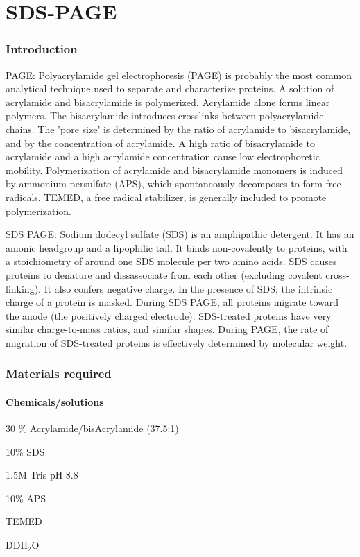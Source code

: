 \part{SDS-PAGE}
\newpage
\setlength{\parindent}{0pt}
\setcounter{secnumdepth}{5}
\setcounter{section}{0}
\renewcommand*{\theHsection}{sds.\the\value{section}}
 
\section{Introduction}
\underline{PAGE:}
Polyacrylamide gel electrophoresis (PAGE) is probably the most common analytical technique used to separate and characterize proteins. A solution of acrylamide and bisacrylamide is polymerized. Acrylamide alone forms linear polymers. The bisacrylamide introduces crosslinks between polyacrylamide chains. The 'pore size' is determined by the ratio of acrylamide to bisacrylamide, and by the concentration of acrylamide. A high ratio of bisacrylamide to acrylamide and a high acrylamide concentration cause low electrophoretic mobility. Polymerization of acrylamide and bisacrylamide monomers is induced by ammonium persulfate (APS), which spontaneously decomposes to form free radicals. TEMED, a free radical stabilizer, is generally included to promote polymerization.

\underline{SDS PAGE:}
Sodium dodecyl sulfate (SDS) is an amphipathic detergent. It has an anionic headgroup and a lipophilic tail. It binds non-covalently to proteins, with a stoichiometry of around one SDS molecule per two amino acids. SDS causes proteins to denature and dissassociate from each other (excluding covalent cross-linking). It also confers negative charge. In the presence of SDS, the intrinsic charge of a protein is masked. During SDS PAGE, all proteins migrate toward the anode (the positively charged electrode). SDS-treated proteins have very similar charge-to-mass ratios, and similar shapes. During PAGE, the rate of migration of SDS-treated proteins is effectively determined by molecular weight.
\section{Materials required}
	\subsection{Chemicals/solutions}
	\begin{packed_enum}
	\item 30 \% Acrylamide/bisAcrylamide (37.5:1)
	\item 10\% SDS
	\item 1.5M Tris pH 8.8
	\item 10\% APS		
	\item	TEMED		
	\item 	DDH$_{2}$O	
	\end{packed_enum}
	
